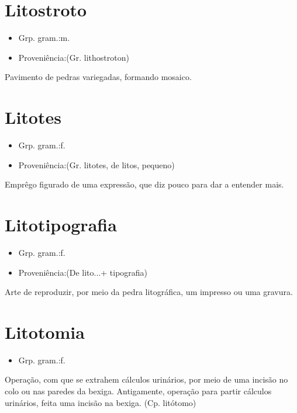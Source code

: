 \section{Litostroto}
\begin{itemize}
\item {Grp. gram.:m.}
\end{itemize}
\begin{itemize}
\item {Proveniência:(Gr. \textunderscore lithostroton\textunderscore )}
\end{itemize}
Pavimento de pedras variegadas, formando mosaico.
\section{Litotes}
\begin{itemize}
\item {Grp. gram.:f.}
\end{itemize}
\begin{itemize}
\item {Proveniência:(Gr. \textunderscore litotes\textunderscore , de \textunderscore litos\textunderscore , pequeno)}
\end{itemize}
Emprêgo figurado de uma expressão, que diz pouco para dar a entender mais.
\section{Litotipografia}
\begin{itemize}
\item {Grp. gram.:f.}
\end{itemize}
\begin{itemize}
\item {Proveniência:(De \textunderscore lito...\textunderscore  + \textunderscore tipografia\textunderscore )}
\end{itemize}
Arte de reproduzir, por meio da pedra litográfica, um impresso ou uma gravura.
\section{Litotomia}
\begin{itemize}
\item {Grp. gram.:f.}
\end{itemize}
Operação, com que se extrahem cálculos urinários, por meio de uma incisão no colo ou nas paredes da bexiga.
Antigamente, operação para partir cálculos urinários, feita uma incisão na bexiga.
(Cp. \textunderscore litótomo\textunderscore )
